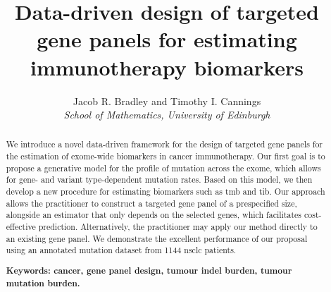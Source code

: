 \documentclass[12pt]{article}
\title{Data-driven design of targeted gene panels for estimating immunotherapy biomarkers}
\author{Jacob R. Bradley and Timothy I. Cannings
 \\ \emph{School of Mathematics, University of Edinburgh}}
\date{}
\begin{document}
\maketitle
\begin{abstract}
We introduce a novel data-driven framework for the design of targeted gene panels for the estimation of exome-wide biomarkers in cancer immunotherapy. Our first goal is to propose a generative model for the profile of mutation across the exome, which allows for gene- and variant type-dependent mutation rates. Based on this model, we then develop a new procedure for estimating biomarkers such as \acrlong{tmb} and \acrlong{tib}.  Our approach allows the practitioner to construct a targeted gene panel of a prespecified size, alongside an estimator that only depends on the selected genes, which facilitates cost-effective prediction.  Alternatively, the practitioner may apply our method directly to an existing gene panel. We demonstrate the excellent performance of our proposal using an annotated mutation dataset from 1144 \acrlong{nsclc} patients. 




\textbf{Keywords: cancer, gene panel design, tumour indel burden, tumour mutation burden.}
\end{abstract}
\end{document}
